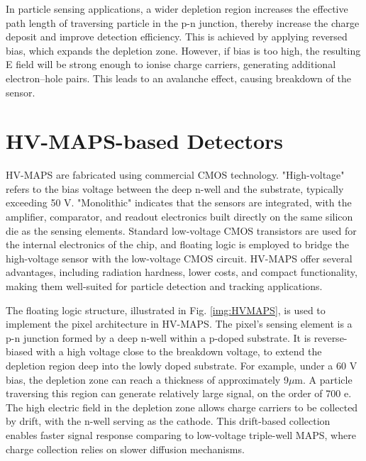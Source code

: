 In particle sensing applications, a wider depletion region increases the effective path length of traversing particle in the p-n junction, thereby increase the charge deposit and improve detection efficiency. This is achieved by applying reversed bias, which expands the depletion zone. However, if bias is too high, the resulting E field will be strong enough to ionise charge carriers, generating additional electron–hole pairs. This leads to an avalanche effect, causing breakdown of the sensor.



\section{HV-MAPS-based Detectors}
\label{section3.2}

HV-MAPS are fabricated using commercial CMOS technology. "High-voltage" refers to the bias voltage between the deep n-well and the substrate, typically exceeding 50 V. "Monolithic" indicates that the sensors are integrated, with the amplifier, comparator, and readout electronics built directly on the same silicon die as the sensing elements. Standard low-voltage CMOS transistors are used for the internal electronics of the chip, and floating logic is employed to bridge the high-voltage sensor with the low-voltage CMOS circuit. HV-MAPS offer several advantages, including radiation hardness, lower costs, and compact functionality, making them well-suited for particle detection and tracking applications\cite{HVMAPS}. 

The floating logic structure, illustrated in Fig. \ref{img:HVMAPS}, is used to implement the pixel architecture in HV-MAPS. The pixel's sensing element is a p-n junction formed by a deep n-well within a p-doped substrate. It is reverse-biased with a high voltage close to the breakdown voltage, to extend the depletion region deep into the lowly doped substrate. For example, under a 60 V bias, the depletion zone can reach a thickness of approximately 9$\mu$m. A particle  traversing this region can generate relatively large signal, on the order of 700 e\cite{HVMAPS2}. The high electric field in the depletion zone allows charge carriers to be collected by drift, with the n-well serving as the cathode. This drift-based collection enables faster signal response comparing to low-voltage triple-well MAPS, where charge collection relies on slower diffusion mechanisms.


